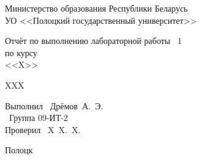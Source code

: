 \begin{titlepage}

  \newpage

  \begin{center}
    Министерство образования Республики Беларусь \\
    \vspace{0.5cm}
    УО <<Полоцкий государственный университет>> \\
  \end{center}

  \vspace{6em}


  \vspace{9em}

  \begin{center}
    \Large Отчёт по выполнению лабораторной работы \textnumero\ 1 \\ 
    по курсу \\ 
    <<X>>
  \end{center}

  \vspace{1.5em}

  \begin{center}
    \large XXX
  \end{center}

  \vspace{6em}

  \begin{flushleft}
    Выполнил \hfill\ Дрёмов~А.~Э. \\
    \hfill\ Группа 09-ИТ-2 \\
    \vspace{1.5em}
    Проверил \hfill\ X~X.~X. \\
  \end{flushleft}

  \vspace{\fill}

  \begin{center}
    Полоцк \\ 
    \the\year
  \end{center}

\end{titlepage}
